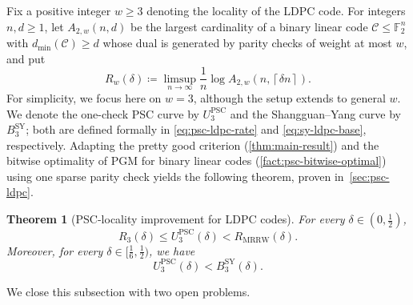 \documentclass[11pt]{article}
\renewcommand{\leq}{\leqslant}
\renewcommand{\geq}{\geqslant}
\newtheorem{theorem}{Theorem}
\theoremstyle{remark}
\newcommand{\cC}{\mathcal{C}}
\newcommand{\F}{\mathbb{F}}
\newcommand{\MRRW}{R_{\mathrm{MRRW}}}
\newcommand{\ceil}[1]{\left\lceil #1 \right\rceil}
\newcommand{\PSC}{\mathrm{PSC}}
\begin{document}
Fix a positive integer $w \geq 3$ denoting the locality of the LDPC code. For integers $n,d \geq 1$, let $A_{2,w}(n,d)$ be the largest cardinality of a binary linear code $\cC \leq \F_2^n$ with $d_{\min}(\cC) \geq d$ whose dual is generated by parity checks of weight at most $w$, and put
\begin{equation*}
R_w(\delta) \coloneqq \limsup_{n \to \infty}\frac{1}{n} \log{A_{2,w}(n,\ceil{\delta n})}.
\end{equation*}
For simplicity, we focus here on $w = 3$, although the setup extends to general $w$. We denote the one-check PSC curve by $U_3^{\PSC}$ and the Shangguan--Yang curve by $B_3^{\mathrm{SY}}$; both are defined formally in \eqref{eq:psc-ldpc-rate} and \eqref{eq:sy-ldpc-base}, respectively. Adapting the pretty good criterion (\cref{thm:main-result}) and the bitwise optimality of PGM for binary linear codes (\cref{fact:psc-bitwise-optimal}) using one sparse parity check yields the following theorem, proven in~\cref{sec:psc-ldpc}.

\begin{theorem}[PSC-locality improvement for LDPC codes]
\label{thm:psc-ldpc-improvement}
For every $\delta \in (0,\frac{1}{2})$,
\begin{equation}
R_3(\delta)
\leq U_3^{\PSC}(\delta)
< \MRRW(\delta).
\end{equation}
Moreover, for every $\delta \in [\frac{1}{6},\frac{1}{2})$, we have
\begin{equation}
U_3^{\PSC}(\delta)
< B_3^{\mathrm{SY}}(\delta).
\end{equation}
\end{theorem}

We close this subsection with two open problems.
\end{document}
